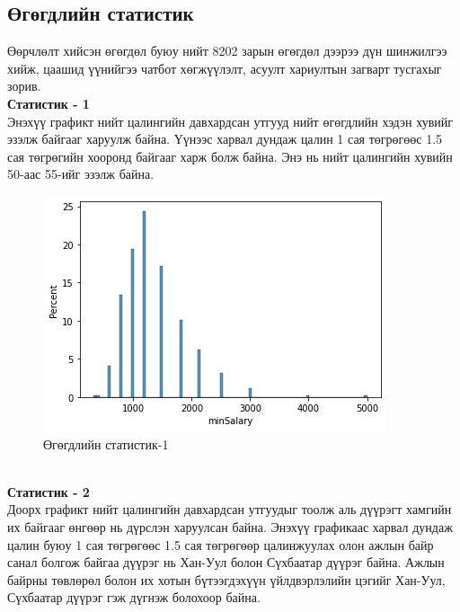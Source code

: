\subsection{Өгөгдлийн статистик}
Өөрчлөлт хийсэн өгөгдөл буюу нийт 8202 зарын өгөгдөл дээрээ дүн шинжилгээ хийж, цаашид үүнийгээ чатбот хөгжүүлэлт, асуулт хариултын загварт тусгахыг зорив.
\\\indent\textbf{Статистик - 1}
\\Энэхүү графикт нийт цалингийн давхардсан утгууд нийт өгөгдлийн хэдэн хувийг эзэлж байгааг харуулж байна. Үүнээс харвал дундаж цалин 1 сая төгрөгөөс 1.5 сая төгрөгийн хооронд байгааг харж болж байна. Энэ нь нийт цалингийн хувийн 50-аас 55-ийг эзэлж байна. 
\begin{figure}[ht]
  \centering
  \includegraphics[width=\textwidth]{graphics/2.png}
  \caption{Өгөгдлийн статистик-1}\label{fig:statistics1}
\end{figure}
\\\indent\textbf{Статистик - 2}
\\Доорх графикт нийт цалингийн давхардсан утгуудыг тоолж аль дүүрэгт хамгийн их байгааг өнгөөр нь дүрслэн харуулсан байна. Энэхүү графикаас харвал дундаж цалин буюу 1 сая төгрөгөөс 1.5 сая төгрөгөөр цалинжуулах олон ажлын байр санал болгож байгаа дүүрэг нь Хан-Уул болон Сүхбаатар дүүрэг байна. Ажлын байрны төвлөрөл болон их хотын бүтээгдэхүүн үйлдвэрлэлийн цэгийг Хан-Уул, Сүхбаатар дүүрэг гэж дүгнэж болохоор байна.  
